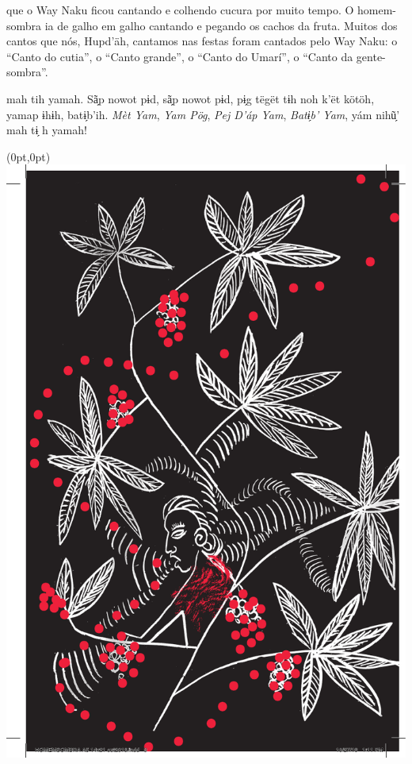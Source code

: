 \mbox{}\vspace*{\fill}

 que o Way Naku ficou
cantando e colhendo cucura
por muito tempo. O homem-sombra
ia de galho em galho
cantando e pegando os cachos
da fruta. Muitos dos cantos
que nós, Hupd’äh, cantamos nas
festas foram cantados pelo Way
Naku: o ``Canto do cutia'', o ``Canto
grande'', o ``Canto do Umarí'', o
``Canto da gente-sombra''.

\vspace{2em}

 mah tih yamah. Sã̗p nowot
pɨd, sã̗p nowot pɨd, pɨ̗g tëgët
tɨh noh k’ët kötöh, yamap ɨhɨh,
batɨ̗b’ih. \textit{Mèt Yam}, \textit{Yam Pög}, \textit{Pej
D’áp Yam}, \textit{Batɨ̗b’ Yam}, yám nihũ̗’
mah tɨ̗ h yamah!

\vspace*{\fill}

\pagebreak

\begin{textblock*}{8in}(0pt,0pt)%
\vspace*{-2.8cm}
\hspace*{-3.2cm}\includegraphics[width=153mm]{./imgs/img3.pdf}
\end{textblock*}

